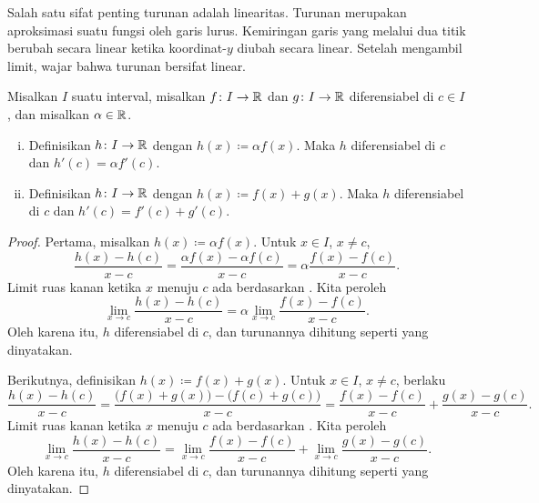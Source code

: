 Salah satu sifat penting turunan adalah linearitas.  Turunan
merupakan aproksimasi suatu fungsi oleh garis lurus.
Kemiringan garis yang melalui dua titik berubah secara linear ketika
koordinat-$y$ diubah secara linear.  Setelah mengambil limit,
wajar bahwa turunan bersifat linear.

\begin{prop}[Linearitas]
Misalkan $I$ suatu interval, misalkan
$f \colon I \to {\mathbb{R}}$ dan $g \colon I \to {\mathbb{R}}$ diferensiabel di $c \in I$,
dan misalkan $\alpha \in {\mathbb{R}}$.
\begin{enumerate}[(i)]
\item
Definisikan $h \colon I \to {\mathbb{R}}$ dengan $h(x) \coloneqq \alpha f(x)$.  Maka
$h$ diferensiabel di $c$ dan
$h'(c) = \alpha f'(c)$.
\item
Definisikan $h \colon I \to {\mathbb{R}}$ dengan $h(x) \coloneqq  f(x) + g(x)$.  Maka
$h$ diferensiabel di $c$ dan
$h'(c) =  f'(c) + g'(c)$.
\end{enumerate}
\end{prop}

\begin{proof}
Pertama, misalkan $h(x) \coloneqq \alpha f(x)$.
Untuk $x \in I$, $x \neq c$,
\begin{equation*}
\frac{h(x)-h(c)}{x-c} =
\frac{\alpha f(x) - \alpha f(c)}{x-c}
=
\alpha \frac{f(x) - f(c)}{x-c} .
\end{equation*}
Limit ruas kanan ketika $x$ menuju $c$ ada
berdasarkan .  Kita peroleh
\begin{equation*}
\lim_{x\to c}\frac{h(x)-h(c)}{x-c} =
\alpha \lim_{x\to c} \frac{f(x) - f(c)}{x-c} .
\end{equation*}
Oleh karena itu, $h$ diferensiabel di $c$,
dan turunannya dihitung seperti yang dinyatakan.

Berikutnya, definisikan $h(x) \coloneqq f(x)+g(x)$.
Untuk $x \in I$, $x \neq c$, berlaku
\begin{equation*}
\frac{h(x)-h(c)}{x-c} =
\frac{\bigl(f(x) + g(x)\bigr) - \bigl(f(c) + g(c)\bigr)}{x-c}
=
\frac{f(x) - f(c)}{x-c}
+
\frac{g(x) - g(c)}{x-c} .
\end{equation*}
Limit ruas kanan ketika $x$ menuju $c$ ada
berdasarkan .  Kita peroleh
\begin{equation*}
\lim_{x\to c}\frac{h(x)-h(c)}{x-c} =
\lim_{x\to c} \frac{f(x) - f(c)}{x-c}
+
\lim_{x\to c}\frac{g(x) - g(c)}{x-c} .
\end{equation*}
Oleh karena itu, $h$ diferensiabel di $c$,
dan turunannya dihitung seperti yang dinyatakan.
\end{proof}

